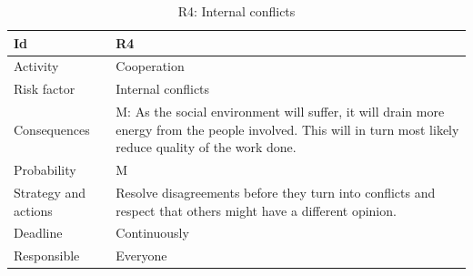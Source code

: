 \documentclass[11pt]{book}
\begin{document}
\begin{table}[H]
\centering
\begin{tabular}{ l  p{11cm} }
    Id                      & R4                                                                          \\ \hline
    Activity                & Cooperation                                                                 \\ \hline
    Risk factor             & Internal conflicts                                                          \\ \hline
    Consequences            & M: As the social environment will suffer, it will drain more energy from 
                                the people involved. This will in turn most likely reduce quality of 
                                the work done.                                                            \\ \hline
    Probability             & M                                                                           \\ \hline
    Strategy and actions    & Resolve disagreements before they turn into conflicts and respect that 
                              others might have a different opinion.                                      \\ \hline
    Deadline                & Continuously                                                                \\ \hline
    Responsible             & Everyone                                                                    \\ 
\end{tabular}
\caption{R4: Internal conflicts}
\label{tab:risk_4}
\end{table}
\end{document}
